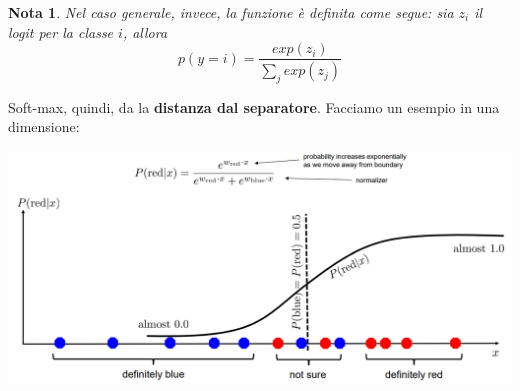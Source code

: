 \documentclass[12pt]{article}
\newtheorem{Nota}{Nota}[subsection]
\begin{document}
\begin{Nota}
    Nel caso generale, invece, la funzione è definita come segue: sia $z_i$ il logit per la classe $i$, allora
    $$p(y = i) = \frac{exp(z_i)}{\sum_j exp(z_j)}$$
\end{Nota}
Soft-max, quindi, da la \textbf{distanza dal separatore}. Facciamo un esempio in una dimensione:
\begin{center}
    \includegraphics[width =1\linewidth]{Images/113.PNG}
\end{center}
\end{document}
